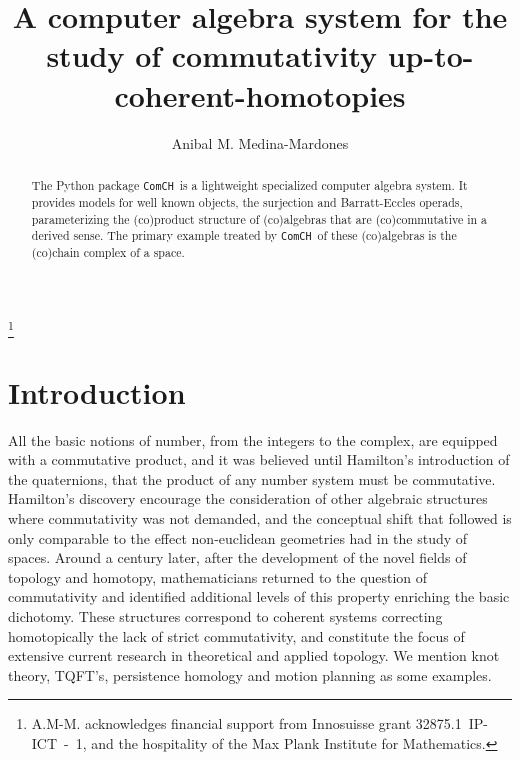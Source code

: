 \documentclass{amsart}
\newcommand{\comch}{\texttt{ComCH}}
\begin{document}
\title[A C.A.S. for the study of commutativity up-to-coherent-homotopies]{A computer algebra system for the study of commutativity up-to-coherent-homotopies}
\author{Anibal M. Medina-Mardones}
\address{Max Plank Institute for Mathematics, Bonn, Germany}
\address{Department of Mathematics, University of Notre Dame, Notre Dame, IN, USA}
\thanks{A.M-M. acknowledges financial support from Innosuisse grant \mbox{32875.1 IP-ICT - 1}, and the hospitality of the Max Plank Institute for Mathematics.}

\begin{abstract}
	The Python package \comch\, is a lightweight specialized computer algebra system. It provides models for well known objects, the surjection and Barratt-Eccles operads, parameterizing the (co)product structure of (co)algebras that are (co)commutative in a derived sense. The primary example treated by \comch\, of these (co)algebras is the (co)chain complex of a space.
\end{abstract} 

\maketitle

\section{Introduction}

All the basic notions of number, from the integers to the complex, are equipped with a commutative product, and it was believed until Hamilton's introduction of the quaternions, that the product of any number system must be commutative. Hamilton's discovery encourage the consideration of other algebraic structures where commutativity was not demanded, and the conceptual shift that followed is only comparable to the effect non-euclidean geometries had in the study of spaces. Around a century later, after the development of the novel fields of topology and homotopy, mathematicians returned to the question of commutativity and identified additional levels of this property enriching the basic dichotomy. These structures correspond to coherent systems correcting homotopically the lack of strict commutativity, and constitute the focus of extensive current research in theoretical and applied topology. We mention knot theory, TQFT's, persistence homology and motion planning as some examples.
\end{document}

